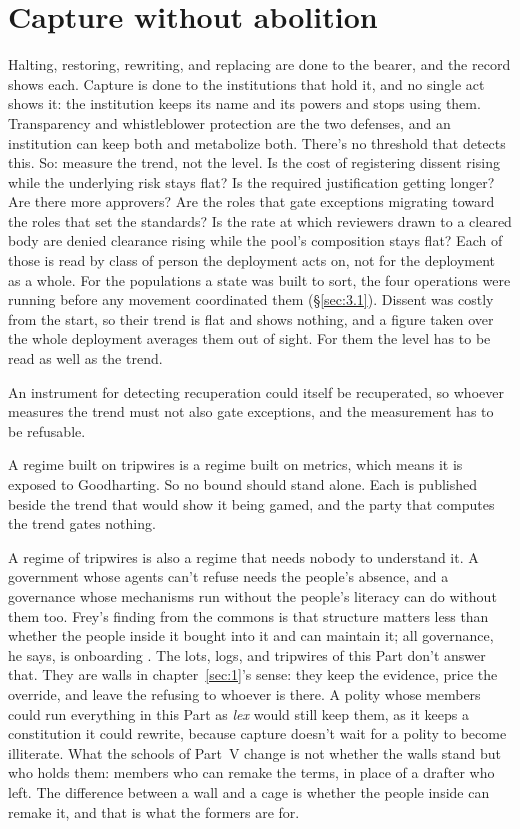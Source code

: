 \section{Capture without abolition}
\label{sec:13.7}
Halting, restoring, rewriting, and replacing are done to the bearer, and the record shows each. Capture is done to the institutions that hold it, and no single act shows it: the institution keeps its name and its powers and stops using them. Transparency and whistleblower protection are the two defenses, and an institution can keep both and metabolize both. There's no threshold that detects this. So: measure the trend, not the level. Is the cost of registering dissent rising while the underlying risk stays flat? Is the required justification getting longer? Are there more approvers? Are the roles that gate exceptions migrating toward the roles that set the standards? Is the rate at which reviewers drawn to a cleared body are denied clearance rising while the pool's composition stays flat? Each of those is read by class of person the deployment acts on, not for the deployment as a whole. For the populations a state was built to sort, the four operations were running before any movement coordinated them (\S\ref{sec:3.1}). Dissent was costly from the start, so their trend is flat and shows nothing, and a figure taken over the whole deployment averages them out of sight. For them the level has to be read as well as the trend.

An instrument for detecting recuperation could itself be recuperated, so whoever measures the trend must not also gate exceptions, and the measurement has to be refusable.

A regime built on tripwires is a regime built on metrics, which means it is exposed to Goodharting. So no bound should stand alone. Each is published beside the trend that would show it being gamed, and the party that computes the trend gates nothing.

A regime of tripwires is also a regime that needs nobody to understand it. A government whose agents can't refuse needs the people's absence, and a governance whose mechanisms run without the people's literacy can do without them too. Frey's finding from the commons is that structure matters less than whether the people inside it bought into it and can maintain it; all governance, he says, is onboarding \autocite{frey2026decentralization}. The lots, logs, and tripwires of this Part don't answer that. They are walls in chapter~\ref{sec:1}'s sense: they keep the evidence, price the override, and leave the refusing to whoever is there. A polity whose members could run everything in this Part as \emph{lex} would still keep them, as it keeps a constitution it could rewrite, because capture doesn't wait for a polity to become illiterate. What the schools of Part~V change is not whether the walls stand but who holds them: members who can remake the terms, in place of a drafter who left. The difference between a wall and a cage is whether the people inside can remake it, and that is what the formers are for.
